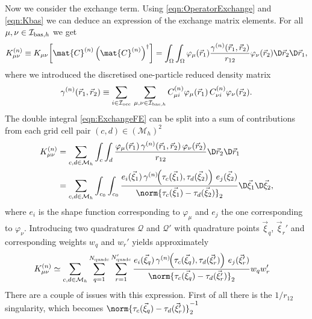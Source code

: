 Now we consider the exchange term.
Using \eqref{eqn:OperatorExchange} and \eqref{eqn:Kbas} we can
deduce an expression of the exchange matrix elements.
For all $\mu, \nu \in \mathcal{I}_{\text{bas},h}$ we get
\begin{equation}
	\label{eqn:ExchangeFE}
	K^{(n)}_{\mu\nu} \equiv
	K_{\mu\nu}\!\left[\mat{C}^{(n)} \left(\mat{C}^{(n)}\right)^\dagger\right]
	= \int_\Omega \int_\Omega
		\varphi_\mu(\vec{r}_1) \frac{\gamma^{(n)}(\vec{r}_1, \vec{r}_2)}
		{ r_{12} }\varphi_\nu(\vec{r}_2) \D \vec{r}_2 \D \vec{r}_1,
\end{equation}
where we introduced the discretised one-particle reduced density matrix
\begin{equation}
	\gamma^{(n)}(\vec{r}_1, \vec{r}_2)
	\equiv \sum_{i\in\mathcal{I}_\text{occ}} \, \sum_{\mu,\nu\in\mathcal{I}_{\text{bas},h}}
	C^{(n)}_{\mu i} \varphi_\mu(\vec{r}_1) \, C^{(n)}_{\nu i} \varphi_\nu(\vec{r}_2).
	\label{eqn:DensityMatrixFE}
\end{equation}
The double integral \eqref{eqn:ExchangeFE}
can be split into a sum of contributions from each grid cell pair
$(c,d) \in \left( \mathcal{M}_h \right)^2$
\begin{align*}
	K^{(n)}_{\mu\nu}
	&= \sum_{c,d \in \mathcal{M}_h}
		\int_{c} \int_{d}
		\frac{\varphi_\mu(\vec{r}_1) \, \gamma^{(n)}(\vec{r}_1, \vec{r}_2)
			\,\varphi_\nu(\vec{r}_2)}
		{r_{12}} \D \vec{r}_2 \D \vec{r}_1 \\
	&= \sum_{c,d \in \mathcal{M}_h}
		\int_{c_0} \int_{c_0}
		\frac{e_i(\vec{\xi}_1)\,
			\gamma^{(n)}\!\!\left(\tau_c(\vec{\xi}_1), \tau_d(\vec{\xi}_2)\right)
			\,e_j(\vec{\xi}_2)}
		{\norm{\tau_c(\vec{\xi}_1) - \tau_d(\vec{\xi}_2)}_2}
		\D \vec{\xi}_1 \D \vec{\xi}_2,
\end{align*}
where $e_i$ is the shape function corresponding to $\varphi_\mu$
and $e_j$ the one corresponding to $\varphi_\nu$.
Introducing two quadratures $\mathcal{Q}$ and $\mathcal{Q}'$
with quadrature points $\vec{\xi}_q$, $\vec{\xi}_r'$
and corresponding weights $w_q$ and $w_r'$ yields approximately
\begin{align*}
	K^{(n)}_{\mu\nu}
		&\simeq \sum_{c,d \in \mathcal{M}_h}
		\sum_{q=1}^{\Nquadc}
		\sum_{r=1}^{\Nquadc'}
		\frac{
			e_i(\vec{\xi}_q) \,
			\gamma^{(n)}\!\!\left(\tau_c(\vec{\xi}_q), \tau_d(\vec{\xi}'_r)\right)
			\,e_j(\vec{\xi}'_r)}
		{\norm{\tau_c(\vec{\xi}_q) - \tau_d(\vec{\xi}'_r)}_2}
		w_q w_r'
\end{align*}
There are a couple of issues with this expression.
First of all there is the $1/r_{12}$ singularity,
which becomes $\norm{\tau_c(\vec{\xi}_q) - \tau_d(\vec{\xi}'_r)}_2^{-1}$
